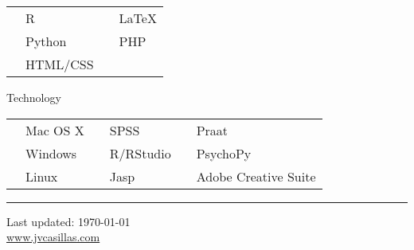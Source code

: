 \documentclass[11pt,letterpaper]{moderncv}
\begin{document}
\begin{tabular}{p{1.15in}lp{.6in}l}
  & R        & & \LaTeX \\
  & Python   & & PHP    \\
  & HTML/CSS & &        \\ [2.5ex]
\end{tabular}

\vspace{.2in}

Technology \vspace{-.18in}

\begin{tabular}{p{1.15in}lp{.7in}lp{.7in}l}
   & Mac OS X             & & SPSS      & & Praat                \\ 
   & Windows              & & R/RStudio & & PsychoPy             \\ 
   & Linux                & & Jasp      & & Adobe Creative Suite \\ [2.5ex]
\end{tabular}

\noindent 

\rule{492pt}{1.5pt}

\smallskip

\begin{center}
  \begin{footnotesize}
    Last updated: \today \\
    \href{http://www.jvcasillas.com}{www.jvcasillas.com}
  \end{footnotesize}
\end{center}


\end{document}
